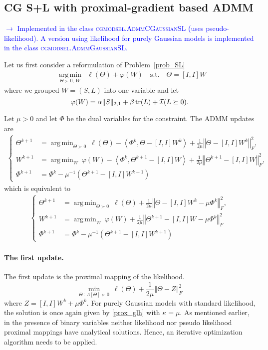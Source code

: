 \documentclass{article}
\newcommand{\loc}[1]{\textcolor{blue}{$\to$ #1}}
\newcommand{\bNorm}[1]{\left\Vert #1\right\Vert} %
\newcommand{\scalp}[1]{ \left\langle #1\right\rangle} %
\DeclareMathOperator{\tr}{tr}
\DeclareMathOperator{\argmin}{arg\,min}
\begin{document}
\subsection{CG S+L with proximal-gradient based ADMM}
\loc{Implemented in the class \textsc{cgmodsel.AdmmCGaussianSL} (uses pseudo-likelihood).
A version using likelihood for purely Gaussian models is implemented in the class \textsc{cgmodsel.AdmmGaussianSL}.}
 
Let us first consider a reformulation of Problem~\ref{prob_SL}
\begin{equation}
\begin{array}{lrlr}
 &\underset{\Theta\succ0,\,W} {\argmin}& \ell(\Theta) + \varphi(W) \quad \textrm{s.t.} \quad\Theta = [I, I]W
\end{array}
\end{equation}
where we grouped $W = (S, L)$ into one variable and let
 \[\varphi(W) =  \alpha \|S\|_{2,1} + \beta \tr (L) + \I(L\succeq0).\]

Let $\mu > 0$ and let $\Phi$ be the dual variables for the constraint. The ADMM updates are
\begin{align*}
	\begin{cases}\Theta^{k+1} &= \argmin_{\Theta\succ0} \: \ell(\Theta) - \scalp{\Phi^k, \Theta - [I, I]W^k} + \frac{1}{2\mu}\bNorm{\Theta - [I, I]W^k}_F^2, \\
	W^{k+1} &= \argmin_W \:\varphi(W) - \scalp{\Phi^k, \Theta^{k+1} - [I, I]W} + \frac{1}{2\mu}\bNorm{\Theta^{k+1} - [I, I]W}_F^2, \\
	\Phi^{k+1} &= \Phi^k - \mu^{-1}(\Theta^{k+1} - [I, I] W^{k+1})\end{cases}
\end{align*}
which is equivalent to
\begin{align}
	\begin{cases}\Theta^{k+1} &= \argmin_{\Theta\succ0} \: \ell(\Theta)  + \frac{1}{2\mu}\bNorm{\Theta - [I, I]W^k - \mu\Phi^k}_F^2, \\
		W^{k+1} &= \argmin_W \:\varphi(W) + \frac{1}{2\mu}\bNorm{\Theta^{k+1} - [I, I]W - \mu\Phi^k}_F^2 \\
		\Phi^{k+1} &= \Phi^k - \mu^{-1}(\Theta^{k+1} - [I, I] W^{k+1})\end{cases} 
\end{align}

\paragraph{The first update.}
The first update is the proximal mapping of the likelihood.
\[\min_{\Theta\,:\, \Lambda[\Theta]\succ0} \: \ell(\Theta) + \frac{1}{2\mu} \bNorm{\Theta - Z}_F^2\]
where $Z =[I, I]W^k + \mu\Phi^k$. For purely Gaussian models with standard likelihood, the solution is once again given by \eqref{prox_glh} with $\kappa = \mu$.
As mentioned earlier, in the presence of binary variables neither likelihood nor pseudo likelihood proximal mappings have analytical solutions. Hence, an iterative optimization algorithm needs to be applied.
\end{document}
